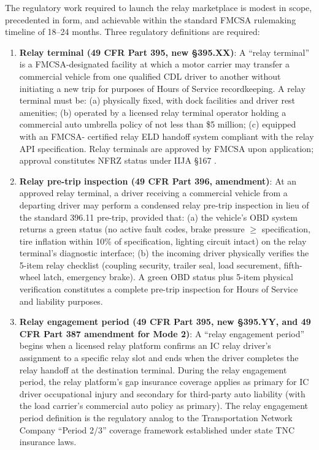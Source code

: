 The regulatory work required to launch the relay marketplace is modest in scope, precedented
in form, and achievable within the standard FMCSA rulemaking timeline of 18--24 months.
Three regulatory definitions are required:

\begin{enumerate}
  \item \textbf{Relay terminal (49 CFR Part 395, new \S 395.XX)}: A ``relay terminal'' is a
  FMCSA-designated facility at which a motor carrier may transfer a commercial vehicle from
  one qualified CDL driver to another without initiating a new trip for purposes of Hours of
  Service recordkeeping. A relay terminal must be: (a) physically fixed, with dock facilities
  and driver rest amenities; (b) operated by a licensed relay terminal operator holding a
  commercial auto umbrella policy of not less than \$5 million; (c) equipped with an FMCSA-
  certified relay ELD handoff system compliant with the relay API specification. Relay
  terminals are approved by FMCSA upon application; approval constitutes NFRZ status under
  IIJA \S 167 \citep{FMCSA_HOS2022}.

  \item \textbf{Relay pre-trip inspection (49 CFR Part 396, amendment)}: At an approved relay
  terminal, a driver receiving a commercial vehicle from a departing driver may perform a
  condensed relay pre-trip inspection in lieu of the standard 396.11 pre-trip, provided that:
  (a) the vehicle's OBD system returns a green status (no active fault codes, brake pressure
  $\geq$ specification, tire inflation within 10\% of specification, lighting circuit intact) on
  the relay terminal's diagnostic interface; (b) the incoming driver physically verifies the
  5-item relay checklist (coupling security, trailer seal, load securement, fifth-wheel latch,
  emergency brake). A green OBD status plus 5-item physical verification constitutes a complete
  pre-trip inspection for Hours of Service and liability purposes.

  \item \textbf{Relay engagement period (49 CFR Part 395, new \S 395.YY, and 49 CFR Part 387
  amendment for Mode 2)}: A ``relay engagement period'' begins when a licensed relay platform
  confirms an IC relay driver's assignment to a specific relay slot and ends when the driver
  completes the relay handoff at the destination terminal. During the relay engagement period,
  the relay platform's gap insurance coverage applies as primary for IC driver occupational
  injury and secondary for third-party auto liability (with the load carrier's commercial auto
  policy as primary). The relay engagement period definition is the regulatory analog to the
  Transportation Network Company ``Period 2/3'' coverage framework established under state TNC
  insurance laws.
\end{enumerate}


